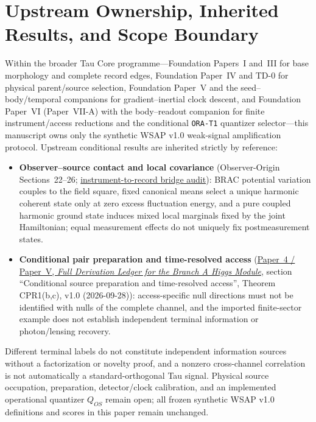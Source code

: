 \documentclass[12pt]{article}
\begin{document}
\section{Upstream Ownership, Inherited Results, and Scope Boundary}
\label{sec:upstream-ownership}

Within the broader Tau Core programme---Foundation Papers~I and~III for base
morphology and complete record edges, Foundation Paper~IV and TD-0 for physical
parent/source selection, Foundation Paper~V and the seed--body/temporal
companions for gradient--inertial clock descent, and Foundation Paper~VI
(Paper~VII-A) with the body--readout companion for finite instrument/access
reductions and the conditional \texttt{ORA-T1} quantizer selector---this
manuscript owns only the synthetic WSAP v1.0 weak-signal amplification
protocol. Upstream conditional results are inherited strictly by reference:
\begin{itemize}
\item \textbf{Observer--source contact and local covariance} (Observer-Origin
Sections~22--26;
\href{https://github.com/tau-core-research/tau-core-theory/blob/main/docs/tau_rqm_instrument_to_record_bridge_001.md}{instrument-to-record bridge audit}):
BRAC potential variation couples to the field square, fixed canonical means
select a unique harmonic coherent state only at zero excess fluctuation energy,
and a pure coupled harmonic ground state induces mixed local marginals fixed by
the joint Hamiltonian; equal measurement effects do not uniquely fix
postmeasurement states.
\item \textbf{Conditional pair preparation and time-resolved access}
(\href{https://github.com/tau-core-research/tau-core-higgs-module-paper4/blob/main/paper4_full_derivation/full_derivation.pdf#nameddest=cpr1}{Paper~4 / Paper~V, \emph{Full Derivation Ledger for the Branch A Higgs Module}},
section ``Conditional source preparation and time-resolved access'', Theorem
CPR1(b,c), v1.0 (2026-09-28)): access-specific null directions must not be
identified with nulls of the complete channel, and the imported finite-sector
example does not establish independent terminal information or photon/lensing
recovery.
\end{itemize}
Different terminal labels do not constitute independent information sources
without a factorization or novelty proof, and a nonzero cross-channel
correlation is not automatically a standard-orthogonal Tau signal. Physical
source occupation, preparation, detector/clock calibration, and an implemented
operational quantizer $Q_{OS}$ remain open; all frozen synthetic WSAP v1.0
definitions and scores in this paper remain unchanged.
\end{document}
